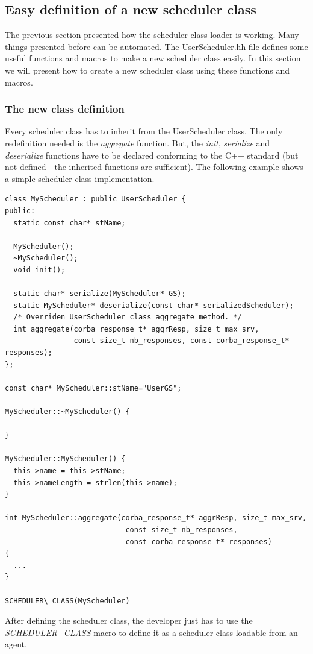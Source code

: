\subsection{Easy definition of a new scheduler class}
The previous section presented how the scheduler class loader is working. Many
things presented before can be automated. The UserScheduler.hh file defines
some useful functions and macros to make a new scheduler class easily. In this
section we will present how to create a new scheduler class using these
functions and macros.

\subsubsection{The new class definition}
Every scheduler class has to inherit from the UserScheduler class. The only
redefinition needed is the \textit{aggregate} function. But, the \textit{init},
\textit{serialize} and \textit{deserialize} functions have to be declared
conforming to the C++ standard (but not defined - the inherited functions are
sufficient). The following example shows a simple scheduler class
implementation.
\begin{verbatim}
class MyScheduler : public UserScheduler {
public:
  static const char* stName;

  MyScheduler();
  ~MyScheduler();
  void init();

  static char* serialize(MyScheduler* GS);
  static MyScheduler* deserialize(const char* serializedScheduler);
  /* Overriden UserScheduler class aggregate method. */
  int aggregate(corba_response_t* aggrResp, size_t max_srv,
                const size_t nb_responses, const corba_response_t* responses);
};

const char* MyScheduler::stName="UserGS";

MyScheduler::~MyScheduler() {

}

MyScheduler::MyScheduler() {
  this->name = this->stName;
  this->nameLength = strlen(this->name);
}

int MyScheduler::aggregate(corba_response_t* aggrResp, size_t max_srv,
                            const size_t nb_responses,
                            const corba_response_t* responses)
{
  ...
}

SCHEDULER\_CLASS(MyScheduler)
\end{verbatim}
After defining the scheduler class, the developer just has to use the
\textit{SCHEDULER\_CLASS} macro to define it as a scheduler class loadable
from an agent.

